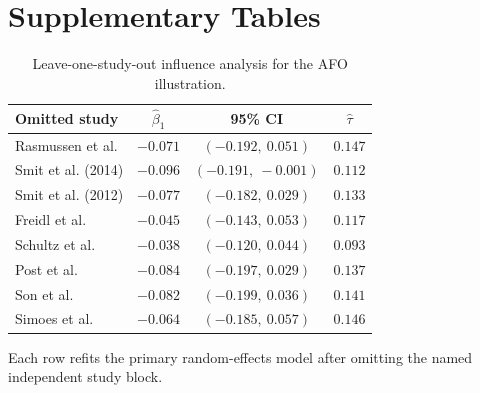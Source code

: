 \documentclass[11pt]{article}
\begin{document}
\section*{Supplementary Tables}

\begin{table}[htbp]
\centering
\caption{Leave-one-study-out influence analysis for the AFO illustration.}
\label{tab:supp_afo_loo}
\small
\begin{tabular}{lccc}
\toprule
Omitted study & $\hat\beta_1$ & 95\% CI & $\hat\tau$ \\
\midrule
Rasmussen et al. & $-0.071$ & $(-0.192,\ 0.051)$ & $0.147$ \\
Smit et al. (2014) & $-0.096$ & $(-0.191,\ -0.001)$ & $0.112$ \\
Smit et al. (2012) & $-0.077$ & $(-0.182,\ 0.029)$ & $0.133$ \\
Freidl et al. & $-0.045$ & $(-0.143,\ 0.053)$ & $0.117$ \\
Schultz et al. & $-0.038$ & $(-0.120,\ 0.044)$ & $0.093$ \\
Post et al. & $-0.084$ & $(-0.197,\ 0.029)$ & $0.137$ \\
Son et al. & $-0.082$ & $(-0.199,\ 0.036)$ & $0.141$ \\
Simoes et al. & $-0.064$ & $(-0.185,\ 0.057)$ & $0.146$ \\
\bottomrule
\end{tabular}
\par\smallskip
{\footnotesize Each row refits the primary random-effects model after omitting the named independent study block.}
\end{table}
\end{document}
